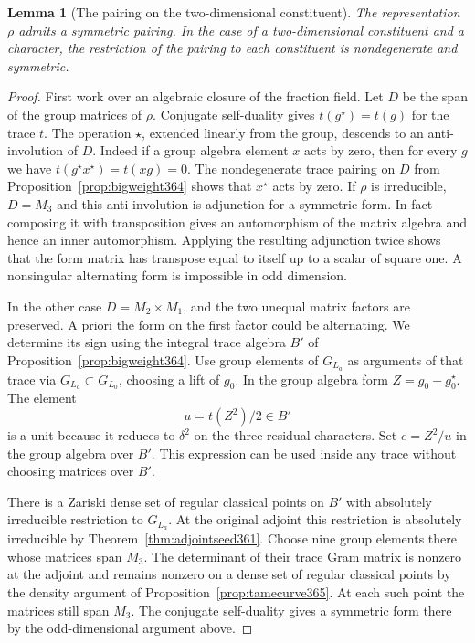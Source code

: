 \documentclass[a4paper,11pt]{article}
\newtheorem{lemma}[proposition]{Lemma}
\theoremstyle{definition}
\theoremstyle{remark}
\numberwithin{equation}{section}
\begin{document}
\begin{lemma}[The pairing on the two-dimensional constituent]
\label{lem:curvesign366}
The representation \(\rho\) admits a symmetric pairing. In
the case of a two-dimensional constituent and a character, the
restriction of the pairing to each constituent is nondegenerate
and symmetric.
\end{lemma}
\begin{proof}
First work over an algebraic closure of the fraction field.
Let \(D\) be the span of the group matrices of \(\rho\).
Conjugate self-duality gives \(t(g^\star)=t(g)\) for the
trace \(t\). The operation \(\star\), extended linearly from
the group, descends to an anti-involution of \(D\). Indeed
if a group algebra element \(x\) acts by zero, then for every
\(g\) we have \(t(g^\star x^\star)=t(xg)=0\).
The nondegenerate trace pairing on \(D\) from
Proposition~\ref{prop:bigweight364} shows that \(x^\star\)
acts by zero. If \(\rho\) is irreducible, \(D=M_3\) and
this anti-involution is adjunction for a symmetric form.
In fact composing it with transposition gives an automorphism
of the matrix algebra and hence an inner automorphism. Applying
the resulting adjunction twice shows that the form matrix
has transpose equal to itself up to a scalar of square one.
A nonsingular alternating form is impossible in odd dimension.

In the other case \(D=M_2\times M_1\), and the two unequal
matrix factors are preserved. A priori the form on the first
factor could be alternating. We determine its sign using the
integral trace algebra \(B'\) of
Proposition~\ref{prop:bigweight364}. Use group elements of
\(G_{L_a}\) as arguments of that trace via \(G_{L_a}\subset
G_{L_0}\), choosing a lift of \(g_0\). In the group algebra
form \(Z=g_0-g_0^\star\). The element
\[
             u=t(Z^2)/2\in B'
\]
is a unit because it reduces to \(\delta^2\) on the three
residual characters. Set \(e=Z^2/u\) in the group algebra over
\(B'\). This expression can be used inside any trace without
choosing matrices over \(B'\).

There is a Zariski dense set of regular classical points
on \(B'\) with absolutely irreducible restriction to \(G_{L_a}\).
At the original adjoint this restriction is absolutely
irreducible by Theorem~\ref{thm:adjointseed361}. Choose nine
group elements there whose matrices span \(M_3\). The determinant
of their trace Gram matrix is nonzero at the adjoint and
remains nonzero on a dense set of regular classical points
by the density argument of Proposition~\ref{prop:tamecurve365}.
At each such point the matrices still span \(M_3\). The
conjugate self-duality gives a symmetric form there by the
odd-dimensional argument above.


\end{proof}
\end{document}
